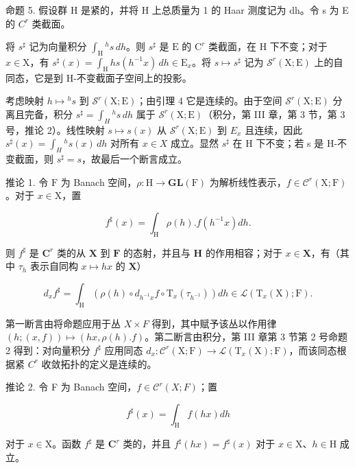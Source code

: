 命题 5. 假设群 H 是紧的，并将 H 上总质量为 1 的 Haar 测度记为 dh。令 s 为 E 的 \(C^{r}\) 类截面。

将 \(s^{\sharp}\) 记为向量积分 \(\int_{\mathrm{H}}{}^{h}s\,dh\)。则 \(s^{\sharp}\) 是 \(\mathrm{E}\) 的 \(\mathrm{C}^r\) 类截面，在 \(\mathrm{H}\) 下不变；对于 \(x \in \mathrm{X}\)，有 \(s^{\sharp}(x) = \int_{\mathrm{H}}hs(h^{-1}x)\,dh \in \mathrm{E}_x\)。将 \(s \mapsto s^{\sharp}\) 记为 \(\mathcal{S}^r(\mathrm{X};\mathrm{E})\) 上的自同态，它是到 H-不变截面子空间上的投影。

考虑映射 \(h \mapsto {}^{h}s\) 到 \(\mathcal{S}^{r}(\mathrm{X};\mathrm{E})\)；由引理 4 它是连续的。由于空间 \(\mathcal{S}^{r}(\mathrm{X};\mathrm{E})\) 分离且完备，积分 \(s^{\sharp} = \int_{H}{}^{h}s\,dh\) 属于 \(\mathcal{S}^{r}(\mathrm{X};\mathrm{E})\)（积分，第 III 章，第 3 节，第 3 号，推论 2）。线性映射 \(s \mapsto s(x)\) 从 \(\mathcal{S}^{r}(\mathrm{X};\mathrm{E})\) 到 \(E_{x}\) 且连续，因此 \(s^{\sharp}(x) = \int_{H}{}^{h}s(x)\,dh\) 对所有 \(x \in X\) 成立。显然 \(s^{\sharp}\) 在 H 下不变；若 s 是 H-不变截面，则 \(s^{\sharp} = s\)，故最后一个断言成立。

推论 1. 令 \(\mathrm{F}\) 为 Banach 空间，\(\rho : \mathrm{H} \to \mathbf{GL}(\mathrm{F})\) 为解析线性表示，\(f \in \mathcal{C}^r(\mathrm{X};\mathrm{F})\)。对于 \(x \in \mathrm{X}\)，置

\[
f ^ {\sharp} (x) = \int_ {\mathrm{H}} \rho (h). f (h ^ {- 1} x) d h.
\]

则 \(f^{\sharp}\) 是 \(\mathbf{C}^r\) 类的从 \(\mathbf{X}\) 到 \(\mathbf{F}\) 的态射，并且与 \(\mathbf{H}\) 的作用相容；对于 \(x \in \mathbf{X}\)，有（其中 \(\tau_h\) 表示自同构 \(x \mapsto hx\) 的 \(\mathbf{X}\)）

\[
d _ {x} f ^ {\sharp} = \int_ {\mathrm{H}} (\rho (h) \circ d _ {h ^ {- 1} x} f \circ \mathrm{T} _ {x} (\tau_ {h ^ {- 1}})) d h \in \mathscr {L} (\mathrm{T} _ {x} (\mathrm{X}); \mathrm{F}).\tag{14}
\]

第一断言由将命题应用于丛 \(X \times F\) 得到，其中赋予该丛以作用律 \((h; (x, f)) \mapsto (hx, \rho(h).f)\)。第二断言由积分，第 III 章第 3 节第 2 号命题 2 得到：对向量积分 \(f^{\sharp}\) 应用同态 \(d_{x} : \mathcal{C}^{r}(\mathrm{X};\mathrm{F}) \to \mathcal{L}(\mathrm{T}_{x}(\mathrm{X});\mathrm{F})\)，而该同态根据紧 \(C^{r}\) 收敛拓扑的定义是连续的。

推论 2. 令 F 为 Banach 空间，\(f \in \mathcal{C}^{r}(X;F)\)；置

\[
f ^ {\sharp} (x) = \int_ {\mathrm{H}} f (h x) d h
\]

对于 \(x \in \mathrm{X}\)。函数 \(f^{\sharp}\) 是 \(\mathbf{C}^r\) 类的，并且 \(f^{\sharp}(hx) = f^{\sharp}(x)\) 对于 \(x \in \mathrm{X}\)、\(h \in \mathrm{H}\) 成立。

